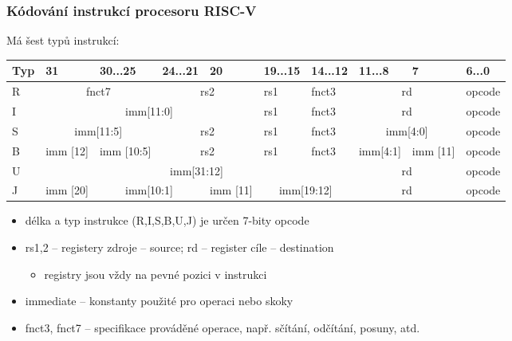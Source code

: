 \begin{frame}
\frametitle{Kódování instrukcí procesoru RISC-V}

Má šest typů instrukcí:
\begin{table}
\footnotesize
\begin{tabular}{|m{0.4cm}|m{0.4cm}|m{1.0cm}|m{1.0cm}|m{0.4cm}|m{1.0cm}|m{1.0cm}|m{1.0cm}|m{0.4cm}|m{1.0cm}|}\hline
Typ & 31 & 30...25 & 24...21 & 20 & 19...15 & 14...12 & 11...8 & 7 & 6...0 \\ \hline
R & \multicolumn{2}{c|}{ fnct7 } & \multicolumn{2}{c|}{ rs2 } & rs1 & fnct3 &\multicolumn{2}{c|}{ rd } & opcode\\ \hline
I & \multicolumn{4}{c|}{ imm[11:0] } & rs1 & fnct3 &\multicolumn{2}{c|}{ rd } & opcode\\ \hline
S & \multicolumn{2}{c|}{ imm[11:5] } & \multicolumn{2}{c|}{ rs2 } & rs1 & fnct3 &\multicolumn{2}{c|}{ imm[4:0] } & opcode\\ \hline
B & imm [12] & imm [10:5]  & \multicolumn{2}{c|}{ rs2 } & rs1 & fnct3 & imm[4:1]& imm [11] & opcode\\ \hline
U & \multicolumn{6}{c|}{ imm[31:12] }  & \multicolumn{2}{c|}{ rd } & opcode\\ \hline
J & imm [20] & \multicolumn{2}{c|}{ imm[10:1] } & imm [11] & \multicolumn{2}{c|}{ imm[19:12] } & \multicolumn{2}{c|}{ rd } & opcode\\ \hline
\end{tabular}
\end{table}

\begin{itemize}
\item délka a typ instrukce (R,I,S,B,U,J) je určen 7-bity opcode
\item rs1,2 -- registery zdroje -- source; rd -- register cíle -- destination
\begin{itemize}
\item registry jsou vždy na pevné pozici v instrukci
\end{itemize}
\item immediate -- konstanty použité pro operaci nebo skoky
\item fnct3, fnct7 -- specifikace prováděné operace, např. sčítání, odčítání, posuny, atd.
\end{itemize}

\end{frame}

